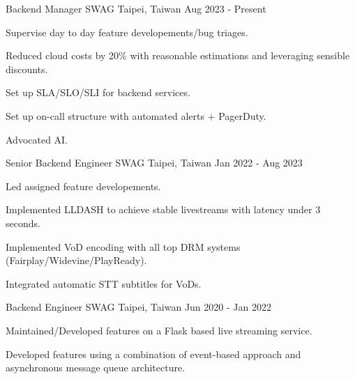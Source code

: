 

\begin{cventries}

  \cventry
    {Backend Manager} %
    {SWAG} %
    {Taipei, Taiwan} %
    {Aug 2023 - Present} %
    {
      \begin{cvitems} %
        \item {Supervise day to day feature developements/bug triages. }
        \item {Reduced cloud costs by 20\% with reasonable estimations and leveraging sensible discounts. }
        \item {Set up SLA/SLO/SLI for backend services. }
        \item {Set up on-call structure with automated alerts + PagerDuty. }
        \item {Advocated AI. }
      \end{cvitems}
    }
    {Senior Backend Engineer} %
    {SWAG} %
    {Taipei, Taiwan} %
    {Jan 2022 - Aug 2023} %
    {
      \begin{cvitems} %
        \item {Led assigned feature developements. }
        \item {Implemented LLDASH to achieve stable livestreams with latency under 3 seconds. }
        \item {Implemented VoD encoding with all top DRM systems (Fairplay/Widevine/PlayReady). }
        \item {Integrated automatic STT subtitles for VoDs. }
      \end{cvitems}
    }
    {Backend Engineer} %
    {SWAG} %
    {Taipei, Taiwan} %
    {Jun 2020 - Jan 2022} %
    {
      \begin{cvitems} %
        \item {Maintained/Developed features on a Flask based live streaming service. }
        \item {Developed features using a combination of event-based approach and asynchronous message queue architecture. }

\end{cvitems}}
\end{cventries}
